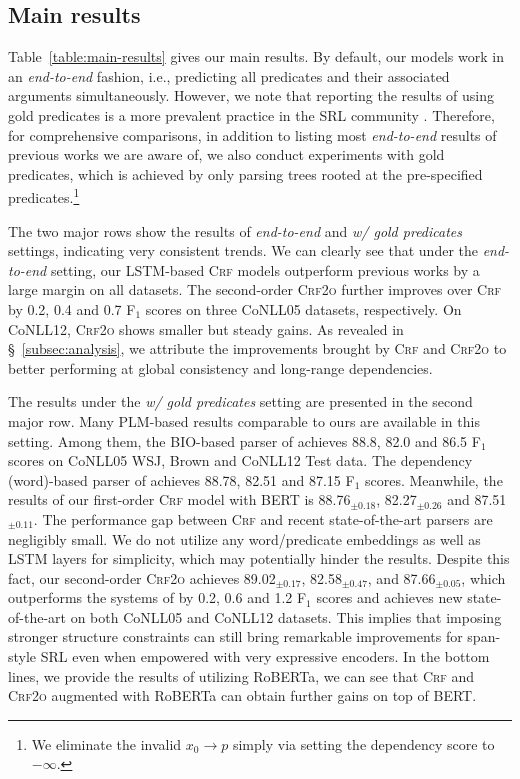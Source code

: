 \documentclass[11pt]{article}
\begin{document}
\subsection{Main results}\label{subsec:results}
Table~\ref{table:main-results} gives our main results.
By default, our models work in an \emph{end-to-end} fashion, i.e., predicting all predicates and their associated arguments simultaneously.
However, we note that reporting the results of using gold predicates is a more prevalent practice in the SRL community \cite{he-etal-2018-jointly,shi-etal-2019-simple}.
Therefore, for comprehensive comparisons, in addition to listing most \emph{end-to-end} results of previous works we are aware of, we also conduct experiments with gold predicates, which is achieved by only parsing trees rooted at the pre-specified predicates.\footnote{We eliminate the invalid $x_0\rightarrow p$ simply via setting the dependency score to $-\infty$.}

The two major rows show the results of \emph{end-to-end} and \emph{w/ gold predicates} settings, indicating very consistent trends.
We can clearly see that under the \emph{end-to-end} setting, our LSTM-based \textsc{Crf} models outperform previous works by a large margin on all datasets.
The second-order \textsc{Crf2o} further improves over \textsc{Crf} by 0.2, 0.4 and 0.7 F$_1$ scores on three CoNLL05 datasets, respectively.
On CoNLL12, \textsc{Crf2o} shows smaller but steady gains.
As revealed in \S~\ref{subsec:analysis}, we attribute the improvements brought by \textsc{Crf} and \textsc{Crf2o} to better performing at global consistency and long-range dependencies.

The results under the \emph{w/ gold predicates} setting are presented in the second major row.
Many PLM-based results comparable to ours are available in this setting.
Among them, the BIO-based parser of \citet{shi-etal-2019-simple} achieves 88.8, 82.0 and 86.5 F$_1$ scores on CoNLL05 WSJ, Brown and CoNLL12 Test data.
The dependency (word)-based parser of \citet{zhou-etal-2022-fast} achieves 88.78,  82.51 and 87.15 F$_1$ scores.
Meanwhile, the results of our first-order \textsc{Crf} model with BERT is 88.76$_{\pm 0.18}$, 82.27$_{\pm 0.26}$ and 87.51$_{\pm 0.11}$.
The performance gap between \textsc{Crf} and recent state-of-the-art parsers are negligibly small.
We do not utilize any word/predicate embeddings as well as LSTM layers for simplicity, which may potentially hinder the results.
Despite this fact, our second-order \textsc{Crf2o} achieves 89.02$_{\pm 0.17}$, 82.58$_{\pm 0.47}$, and 87.66$_{\pm 0.05}$, which outperforms the systems of \citet{shi-etal-2019-simple} by 0.2, 0.6 and 1.2 F$_1$ scores and achieves new state-of-the-art on both CoNLL05 and CoNLL12 datasets.
This implies that imposing stronger structure constraints can still bring remarkable improvements for span-style SRL even when empowered with very expressive encoders.
In the bottom lines, we provide the results of utilizing RoBERTa, we can see that \textsc{Crf} and \textsc{Crf2o} augmented with RoBERTa can obtain further gains on top of BERT.
\end{document}
